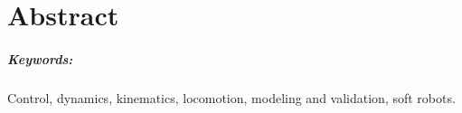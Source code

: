 
\chapter*{Abstract}
\label{chap:abstract}
\doublespacing

\lipsum[2]


\paragraph{Keywords:} Control, dynamics, kinematics, locomotion, modeling and validation, soft robots.


